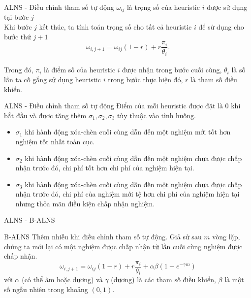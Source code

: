 \begin{frame}{ALNS - Điều chỉnh tham số tự động}
  $\omega_{ij}$ là trọng số của heuristic $i$ được sử dụng tại bước $j$ \\
  Khi bước $j$ kết thúc, ta tính toán trọng số cho tất cả heuristic $i$ để sử dụng cho bước thứ $j + 1$
  \begin{equation}
      \omega_{i, j+1} = \omega_{ij}(1-r)+r\frac{\pi_i}{\theta_i}.
  \end{equation} \\
  Trong đó, $\pi_i$ là điểm số của heuristic $i$ được nhận trong bước cuối cùng, $\theta_i$ là số lần ta cố gắng sử dụng heuristic $i$ trong bước thực hiện đó, $r$ là tham số điều khiển.
\end{frame}

\begin{frame}{ALNS - Điều chỉnh tham số tự động}
  Điểm của mỗi heuristic được đặt là $0$ khi bắt đầu và được tăng thêm $\sigma_1, \sigma_2, \sigma_3$ tùy thuộc vào tình huống.
  \begin{itemize}
    \justifying
    \item $\sigma_1$ khi hành động xóa-chèn cuối cùng dẫn đến một nghiệm mới tốt hơn nghiệm tốt nhất toàn cục.
    \item $\sigma_2$ khi hành động xóa-chèn cuối cùng dẫn đến một nghiệm chưa được chấp nhận trước đó, chi phí tốt hơn chi phí của nghiệm hiện tại.
    \item $\sigma_3$ khi hành động xóa-chèn cuối cùng dẫn đến một nghiệm chưa được chấp nhận trước đó, chi phí của nghiệm mới tệ hơn chi phí của nghiệm hiện tại nhưng thỏa mãn điều kiện chấp nhận nghiệm.
  \end{itemize}
\end{frame}

\begin{frame}{ALNS - B-ALNS}
  \begin{block}{B-ALNS}
    Thêm nhiễu khi điều chỉnh tham số tự động. Giả sử sau $m$ vòng lặp, chúng ta mới lại có một nghiệm được chấp nhận từ lần cuối cùng nghiệm được chấp nhận.
    \begin{equation}
      \label{eq:boost_adaptive_weight}
      \omega_{i, j+1} = \omega_{ij}(1-r)+r\frac{\pi_i} {\theta_i} + \alpha \beta (1 - e^{-\gamma m})
    \end{equation}
    với $\alpha$ (có thể âm hoặc dương) và $\gamma$ (dương) là các tham số điều khiển, $\beta$ là một số ngẫu nhiên trong khoảng $(0,1)$.
  \end{block}
\end{frame}


